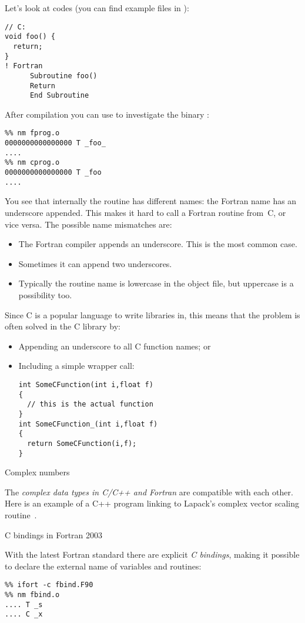 Let's look at codes (you can find example files in ):
\begin{verbatim}
// C:
void foo() {
  return;
}
! Fortran
      Subroutine foo()
      Return
      End Subroutine
\end{verbatim}
After compilation you can use 
 to investigate the binary :
\begin{verbatim}
%% nm fprog.o
0000000000000000 T _foo_
....
%% nm cprog.o
0000000000000000 T _foo
....
\end{verbatim}
You see that internally the  routine has different names:
the Fortran name has an underscore appended. This makes
it hard to call a Fortran routine from~C, or vice versa.
The possible name mismatches are:
\begin{itemize}
\item The Fortran compiler appends an underscore. This is the most common case.
\item Sometimes it can append two underscores.
\item Typically the routine name is lowercase in the object file, but uppercase
      is a possibility too.
\end{itemize}

Since C is a popular language to write libraries in, this means
that the problem is often solved in the C library by:
\begin{itemize}
\item Appending an underscore to all C function names; or
\item Including a simple wrapper call:
\begin{verbatim}
int SomeCFunction(int i,float f)
{
  // this is the actual function
}
int SomeCFunction_(int i,float f)
{
  return SomeCFunction(i,f);
}
\end{verbatim}
\end{itemize}

 {Complex numbers}

The \emph{complex data types in C/C++ and Fortran}%
 are compatible with each
other. Here is an example of a C++ program linking to Lapack's complex
vector scaling routine~.
%

 {C bindings in Fortran 2003}
 
With the latest Fortran standard there are explicit
\emph{C bindings},
making
it possible to declare the
external name of variables and routines:

\begin{verbatim}
%% ifort -c fbind.F90
%% nm fbind.o
.... T _s
.... C _x
\end{verbatim}


